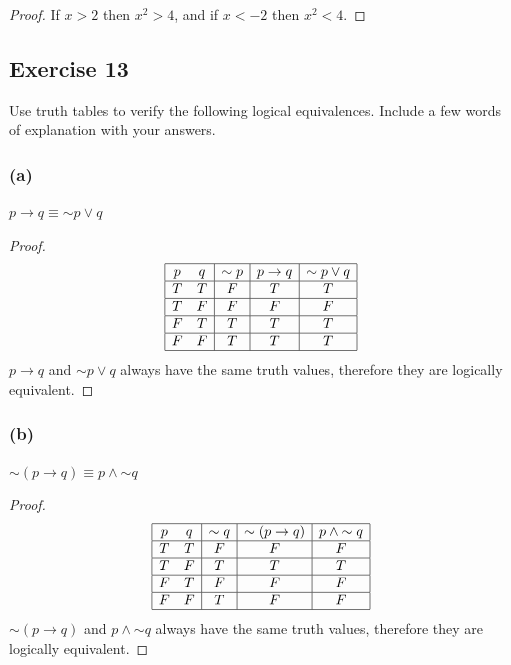 \documentclass[14pt]{extarticle}
\begin{document}
\begin{proof} 
If $x > 2$ then $x^2 > 4$, and if $x < -2$ then $x^2 < 4$.
\end{proof}

\subsection{Exercise 13} 
Use truth tables to verify the following logical equivalences. Include a few words of explanation with your answers.

\subsubsection{(a)} 
$p \to q \equiv {\sim p} \vee q$

\begin{proof} 
$$
\begin{array}{|cc|c|c|c|} 
\hline 
p & q & {\sim p} & p \to q & {\sim p} \vee q \\ 
\hline 
T & T & F & T & T \\ 
\hline 
T & F & F & F & F \\
\hline 
F & T & T & T & T \\ 
\hline 
F & F & T & T & T \\ 
\hline 
\end{array} 
$$ 
$p \to q$ and ${\sim p} \vee q$ always have the same truth values, therefore they are logically equivalent. 
\end{proof}

\subsubsection{(b)} 
${\sim (p \to q)} \equiv p \wedge {\sim q}$

\begin{proof} 
$$ 
\begin{array}{|cc|c|c|c|} 
\hline 
p & q & {\sim q} & {\sim (p \to q)} & p \wedge {\sim q} \\ \hline 
T & T & F & F & F \\ 
\hline 
T & F & T & T & T \\ 
\hline 
F & T & F & F & F \\ 
\hline 
F & F & T & F & F \\ 
\hline
\end{array} 
$$ 
${\sim (p \to q)}$ and $p \wedge {\sim q}$ always have the same truth values, therefore they are logically equivalent. \end{proof}
\end{document}
